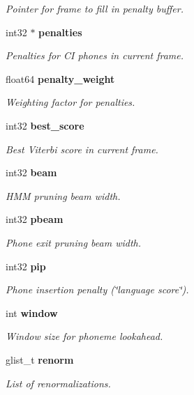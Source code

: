 \begin{DoxyCompactItemize}
\begin{DoxyCompactList}\small\item\em Pointer for frame to fill in penalty buffer. \end{DoxyCompactList}\item 
int32 $\ast$ {\bf penalties}\label{structphone__loop__search__s_a0d01d1eabc94239673b4040e2a6d84fd}

\begin{DoxyCompactList}\small\item\em Penalties for C\-I phones in current frame. \end{DoxyCompactList}\item 
float64 {\bf penalty\-\_\-weight}\label{structphone__loop__search__s_adecb101bb21afd9e2a32c3f59b5abdc7}

\begin{DoxyCompactList}\small\item\em Weighting factor for penalties. \end{DoxyCompactList}\item 
int32 {\bf best\-\_\-score}
\begin{DoxyCompactList}\small\item\em Best Viterbi score in current frame. \end{DoxyCompactList}\item 
int32 {\bf beam}
\begin{DoxyCompactList}\small\item\em H\-M\-M pruning beam width. \end{DoxyCompactList}\item 
int32 {\bf pbeam}
\begin{DoxyCompactList}\small\item\em Phone exit pruning beam width. \end{DoxyCompactList}\item 
int32 {\bf pip}
\begin{DoxyCompactList}\small\item\em Phone insertion penalty (\char`\"{}language score\char`\"{}). \end{DoxyCompactList}\item 
int {\bf window}\label{structphone__loop__search__s_a28788511ed4729a50c1b475312c7b90a}

\begin{DoxyCompactList}\small\item\em Window size for phoneme lookahead. \end{DoxyCompactList}\item 
glist\-\_\-t {\bf renorm}
\begin{DoxyCompactList}\small\item\em List of renormalizations. \end{DoxyCompactList}\end{DoxyCompactItemize}


